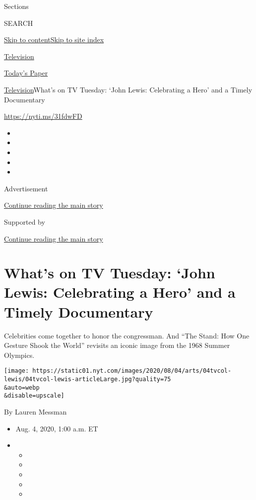 Sections

SEARCH

\protect\hyperlink{site-content}{Skip to
content}\protect\hyperlink{site-index}{Skip to site index}

\href{https://www.nytimes.com/section/arts/television}{Television}

\href{https://myaccount.nytimes.com/auth/login?response_type=cookie\&client_id=vi}{}

\href{https://www.nytimes.com/section/todayspaper}{Today's Paper}

\href{/section/arts/television}{Television}\textbar{}What's on TV
Tuesday: `John Lewis: Celebrating a Hero' and a Timely Documentary

\url{https://nyti.ms/31fdwFD}

\begin{itemize}
\item
\item
\item
\item
\item
\end{itemize}

Advertisement

\protect\hyperlink{after-top}{Continue reading the main story}

Supported by

\protect\hyperlink{after-sponsor}{Continue reading the main story}

\hypertarget{whats-on-tv-tuesday-john-lewis-celebrating-a-hero-and-a-timely-documentary}{%
\section{What's on TV Tuesday: `John Lewis: Celebrating a Hero' and a
Timely
Documentary}\label{whats-on-tv-tuesday-john-lewis-celebrating-a-hero-and-a-timely-documentary}}

Celebrities come together to honor the congressman. And ``The Stand: How
One Gesture Shook the World'' revisits an iconic image from the 1968
Summer Olympics.

\texttt{[image: https://static01.nyt.com/images/2020/08/04/arts/04tvcol-lewis/04tvcol-lewis-articleLarge.jpg?quality=75\\\&auto=webp\\\&disable=upscale]}

By Lauren Messman

\begin{itemize}
\item
  Aug. 4, 2020, 1:00 a.m. ET
\item
  \begin{itemize}
  \item
  \item
  \item
  \item
  \item
  \end{itemize}
\end{itemize}

